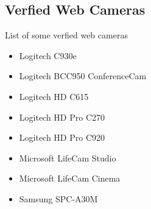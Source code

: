 \begin{appendices}
\chapter{Verfied Web Cameras} 


List of some verfied web cameras \parencite{camerafi}

\begin{itemize}
\item Logitech  C930e
\item Logitech BCC950 ConferenceCam
\item Logitech HD  C615
\item Logitech HD Pro  C270
\item Logitech HD Pro  C920
\item Microsoft LifeCam Studio
\item Microsoft LifeCam Cinema
\item Samsung SPC-A30M
\end{itemize}

\end{appendices}
